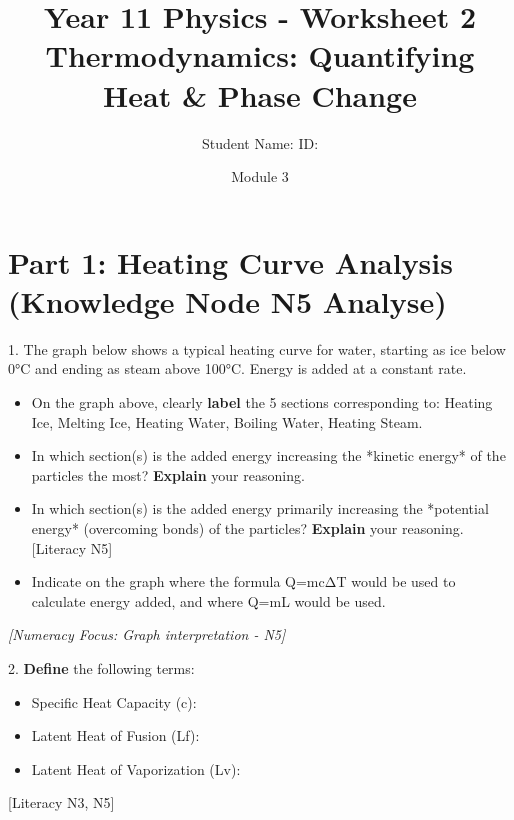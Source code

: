 \documentclass[11pt, a4paper]{article}
\title{Year 11 Physics - Worksheet 2 \\ Thermodynamics: Quantifying Heat & Phase Change}
\date{Module 3}
\author{Student Name: \underline{\hspace{5cm}} ID: \underline{\hspace{3cm}}} %
\begin{document}
\maketitle

\section*{Part 1: Heating Curve Analysis (Knowledge Node N5 Analyse)}

1.  The graph below shows a typical heating curve for water, starting as ice below 0\si{\celsius} and ending as steam above 100\si{\celsius}. Energy is added at a constant rate.

    \begin{center}
    \end{center}

    \begin{itemize}
        \item[(a)] On the graph above, clearly \textbf{label} the 5 sections corresponding to: Heating Ice, Melting Ice, Heating Water, Boiling Water, Heating Steam.
        \item[(b)] In which section(s) is the added energy increasing the *kinetic energy* of the particles the most? \textbf{Explain} your reasoning. \vspace{1cm}
        \item[(c)] In which section(s) is the added energy primarily increasing the *potential energy* (overcoming bonds) of the particles? \textbf{Explain} your reasoning. [Literacy N5] \vspace{1cm}
        \item[(d)] Indicate on the graph where the formula Q=mcΔT would be used to calculate energy added, and where Q=mL would be used.
    \end{itemize}
    \textit{[Numeracy Focus: Graph interpretation - N5]}

2.  \textbf{Define} the following terms:
    \begin{itemize}
        \item Specific Heat Capacity (c): \vspace{1cm}
        \item Latent Heat of Fusion (Lf): \vspace{1cm}
        \item Latent Heat of Vaporization (Lv): \vspace{1cm}
    \end{itemize}
    [Literacy N3, N5]
\end{document}
